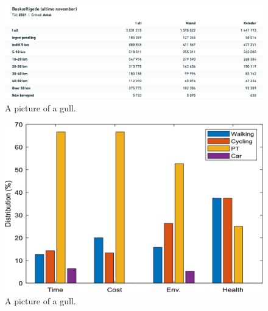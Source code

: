 \begin{figure}
    \centering
    \includegraphics[width=\textwidth]{images/stats}
    \caption{A picture of a gull.}
    \label{fig:figure}
\end{figure}

\begin{figure}
    \includegraphics[width=\textwidth]{images/stats-2}
    \caption{A picture of a gull.}
    \label{fig:figure2}
\end{figure}
